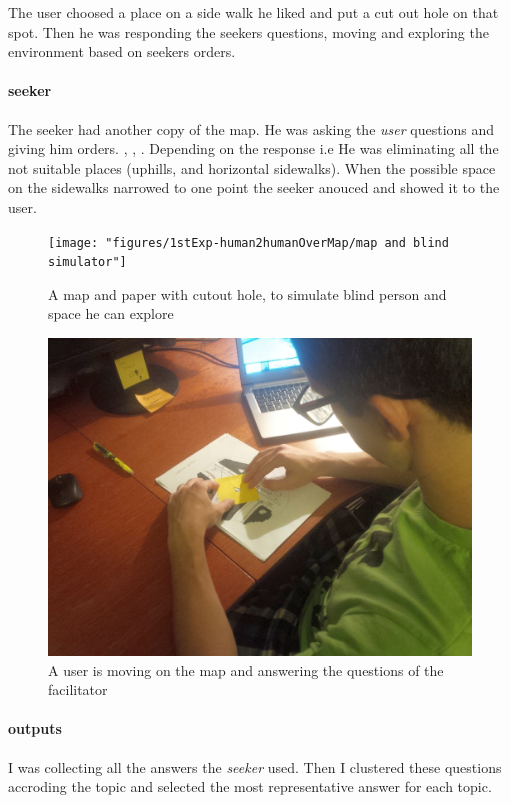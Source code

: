 	The user choosed a place on a side walk he liked and put a cut out hole on that spot. Then he was responding the seekers questions, moving and exploring the environment based on seekers orders.
	
	\paragraph{seeker}
	The seeker had another copy of the map. He was asking the \emph{ user} questions and giving him orders. , , . 
	Depending on the response i.e  He was eliminating all the not suitable places (uphills, and horizontal sidewalks). When the possible space on the sidewalks narrowed to one point the seeker anouced  and showed it to the  user.
	
	\begin{figure}[h]
		\centering
		\texttt{[image: "figures/1stExp-human2humanOverMap/map and blind simulator"]}
		\caption[Map and blind simulator]{A map and paper with cutout hole, to simulate blind person and space he can explore}
		\label{fig:map-and-blind-simulator}
	\end{figure}
	\begin{figure}[h]
		\centering
		\includegraphics[width=0.7\linewidth]{"figures/1stExp-human2humanOverMap/using blind simulator"}
		\caption[User session]{A user is moving on the map and answering the questions of the facilitator}
		\label{fig:user-session}
	\end{figure}
	
	\paragraph{outputs}
	I was collecting all the answers the \emph{seeker} used. Then I clustered these questions accroding the topic and selected the most representative answer for each topic.
	
